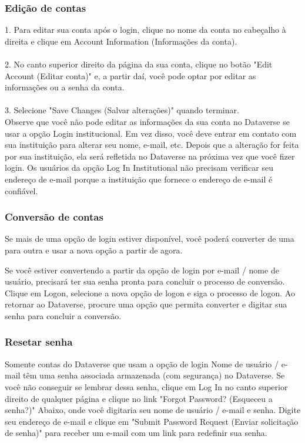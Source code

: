 \documentclass[12pt,hidelinks]{article}
\begin{document}
        \subsubsection{Edição de contas}
        
1. Para editar sua conta após o login, clique no nome da conta no cabeçalho à direita e clique em Account Information (Informações da conta).\\\\
2. No canto superior direito da página da sua conta, clique no botão "Edit Account (Editar conta)" e, a partir daí, você pode optar por editar as informações ou a senha da conta.\\\\
3. Selecione "Save Changes (Salvar alterações)" quando terminar.\\

Observe que você não pode editar as informações da sua conta no Dataverse se usar a opção Login institucional. Em vez disso, você deve entrar em contato com sua instituição para alterar seu nome, e-mail, etc. Depois que a alteração for feita por sua instituição, ela será refletida no Dataverse na próxima vez que você fizer login. Os usuários da opção Log In Institutional  não precisam verificar seu endereço de e-mail porque a instituição que fornece o endereço de e-mail é confiável.
        
        \subsubsection{Conversão de contas}
        
        
\qquad Se mais de uma opção de login estiver disponível, você poderá converter de uma para outra e usar a nova opção a partir de agora.

Se você estiver convertendo a partir da opção de login por e-mail / nome de usuário, precisará ter sua senha pronta para concluir o processo de conversão. Clique em Logon, selecione a nova opção de logon e siga o processo de logon. Ao retornar ao Dataverse, procure uma opção que permita converter e digitar sua senha para concluir a conversão.

        \subsubsection{Resetar senha}
     	
        
\qquad Somente contas do Dataverse que usam a opção de login Nome de usuário / e-mail têm uma senha associada armazenada (com segurança) no Dataverse. Se você não conseguir se lembrar dessa senha, clique em Log In no canto superior direito de qualquer página e clique no link "Forgot Password? (Esqueceu a senha?)" Abaixo, onde você digitaria seu nome de usuário / e-mail e senha. Digite seu endereço de e-mail e clique em "Submit Password Request (Enviar solicitação de senha)" para receber um e-mail com um link para redefinir sua senha.
\end{document}
